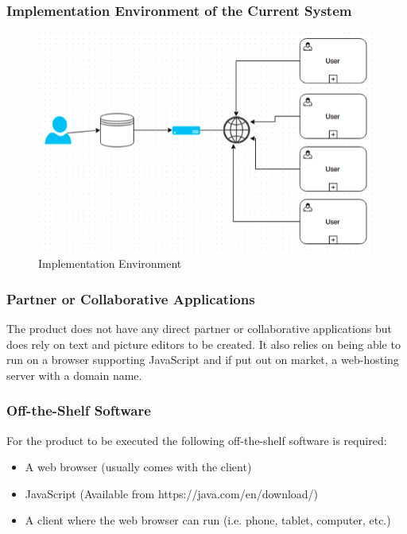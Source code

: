 \documentclass[11pt, oneside]{article}   	%
\begin{document}
\subsubsection{Implementation Environment of the Current System}
\begin{figure}[H] %
   \centering
   \includegraphics[width=6in]{ImplementationEnvironment.png} 
   \caption{Implementation Environment}
   \label{fig:example}
\end{figure}


\subsubsection{Partner or Collaborative Applications}
The product does not have any direct partner or collaborative applications but does rely on text and picture editors to be created. It also relies on being able to run on a browser supporting JavaScript and if put out on market, a web-hosting server with a domain name.


\subsubsection{Off-the-Shelf Software}
For the product to be executed the following off-the-shelf software is required:
\begin{itemize}
\item
A web browser (usually comes with the client)
\item
JavaScript (Available from https://java.com/en/download/)
\item
A client where the web browser can run (i.e. phone, tablet, computer, etc.)
\end{itemize}
\end{document}
